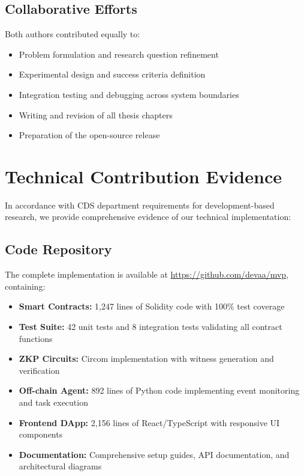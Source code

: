 \subsection{Collaborative Efforts}

Both authors contributed equally to:
\begin{itemize}
    \item Problem formulation and research question refinement
    \item Experimental design and success criteria definition
    \item Integration testing and debugging across system boundaries
    \item Writing and revision of all thesis chapters
    \item Preparation of the open-source release
\end{itemize}

\section{Technical Contribution Evidence}

In accordance with CDS department requirements for development-based research, we provide comprehensive evidence of our technical implementation:

\subsection{Code Repository}
The complete implementation is available at \url{https://github.com/devaa/mvp}, containing:
\begin{itemize}
    \item \textbf{Smart Contracts:} 1,247 lines of Solidity code with 100\% test coverage
    \item \textbf{Test Suite:} 42 unit tests and 8 integration tests validating all contract functions
    \item \textbf{ZKP Circuits:} Circom implementation with witness generation and verification
    \item \textbf{Off-chain Agent:} 892 lines of Python code implementing event monitoring and task execution
    \item \textbf{Frontend DApp:} 2,156 lines of React/TypeScript with responsive UI components
    \item \textbf{Documentation:} Comprehensive setup guides, API documentation, and architectural diagrams
\end{itemize}

